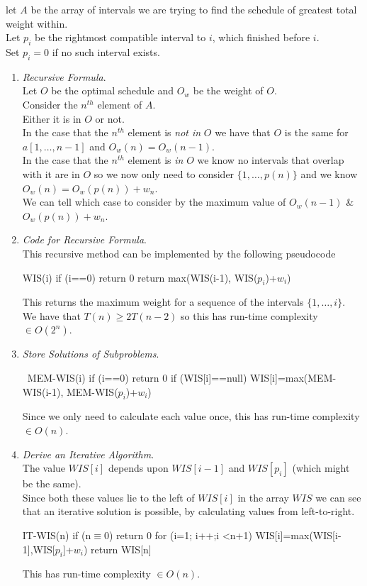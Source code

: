 \documentclass[11pt,a4paper]{article}
\begin{document}
let $A$ be the array of intervals we are trying to find the schedule of greatest total weight within.\\
Let $p_i$ be the rightmost compatible interval to $i$, which finished before $i$.\\
Set $p_i=0$ if no such interval exists.
\begin{enumerate}[label=\roman*)]
\item \textit{Recursive Formula}.\\
Let $O$ be the optimal schedule and $O_w$ be the weight of $O$.\\
Consider the $n^{th}$ element of $A$.\\
Either it is in $O$ or not.\\
In the case that the $n^{th}$ element is \textit{not in} $O$ we have that $O$ is the same for $a[1,\dots,n-1]$ and $O_w(n)=O_w(n-1)$.\\
In the case that the $n^{th}$ element is \textit{in} $O$ we know no intervals that overlap with it are in $O$ so we now only need to consider $\{1,\dots,p(n)\}$ and we know $O_w(n)=O_w(p(n))+w_n$.\\
We can tell which case to consider by the maximum value of $O_w(n-1)$ \& $O_w(p(n))+w_n$.

\item \textit{Code for Recursive Formula}.\\
This recursive method can be implemented by the following pseudocode
\begin{code}
WIS(i)
if (i==0)
  return 0
return max(WIS(i-1), WIS($p_i$)+$w_i$)
\end{code}
This returns the maximum weight for a sequence of the intervals $\{1,\dots,i\}$.\\
\nb We have that $T(n)\geq2T(n-2)$ so this has run-time complexity$\in O(2^n)$.\\

\item \textit{Store Solutions of Subproblems}.
\begin{code}\
MEM-WIS(i)
if (i==0)
  return 0
if (WIS[i]==null)
  WIS[i]=max(MEM-WIS(i-1), MEM-WIS($p_i$)+$w_i$)
\end{code}
\nb Since we only need to calculate each value once, this has run-time complexity $\in O(n)$.\\

\item \textit{Derive an Iterative Algorithm}.\\
The value $WIS[i]$ depends upon $WIS[i-1]$ and $WIS[p_i]$ (which might be the same).\\
Since both these values lie to the left of $WIS[i]$ in the array $WIS$ we can see that an iterative solution is possible, by calculating values from left-to-right.
\begin{code}
IT-WIS(n)
if (n$\equiv$0)
  return 0
for (i=1; i++;i <n+1)
  WIS[i]=max(WIS[i-1],WIS[$p_i$]+$w_i$)
return WIS[n]
\end{code}
\nb This has run-time complexity $\in O(n)$.\\
\end{enumerate}
\end{document}

